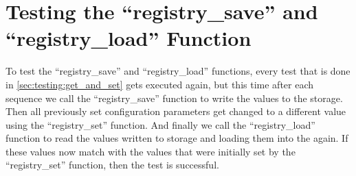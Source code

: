 \section{Testing the ``registry\_save'' and ``registry\_load'' Function}

To test the ``registry\_save'' and ``registry\_load'' functions, every test that is done in \ref{sec:testing:get_and_set} gets executed again, but this time after each sequence we call the ``registry\_save'' function to write the values to the storage.
Then all previously set configuration parameters get changed to a different value using the ``registry\_set'' function.
And finally we call the ``registry\_load'' function to read the values written to storage and loading them into the  again.
If these values now match with the values that were initially set by the ``registry\_set'' function,
then the test is successful.
